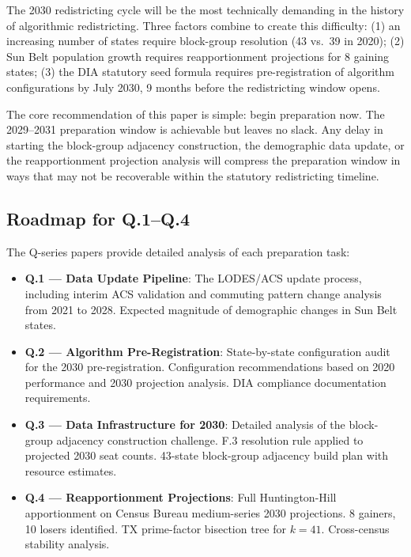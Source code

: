 \label{sec:conclusion}

The 2030 redistricting cycle will be the most technically demanding in the history
of algorithmic redistricting. Three factors combine to create this difficulty:
(1) an increasing number of states require block-group resolution (43 vs.\ 39 in 2020);
(2) Sun Belt population growth requires reapportionment projections for 8 gaining states;
(3) the DIA statutory seed formula requires pre-registration of algorithm configurations
by July 2030, 9 months before the redistricting window opens.

The core recommendation of this paper is simple: begin preparation now.
The 2029--2031 preparation window is achievable but leaves no slack. Any delay
in starting the block-group adjacency construction, the demographic data update,
or the reapportionment projection analysis will compress the preparation window
in ways that may not be recoverable within the statutory redistricting timeline.

\subsection{Roadmap for Q.1--Q.4}

The Q-series papers provide detailed analysis of each preparation task:

\begin{itemize}
\item \textbf{Q.1 --- Data Update Pipeline}: The LODES/ACS update process, including
  interim ACS validation and commuting pattern change analysis from 2021 to 2028.
  Expected magnitude of demographic changes in Sun Belt states.

\item \textbf{Q.2 --- Algorithm Pre-Registration}: State-by-state configuration audit
  for the 2030 pre-registration. Configuration recommendations based on 2020 performance
  and 2030 projection analysis. DIA compliance documentation requirements.

\item \textbf{Q.3 --- Data Infrastructure for 2030}: Detailed analysis of the block-group
  adjacency construction challenge. F.3 resolution rule applied to projected 2030 seat counts.
  43-state block-group adjacency build plan with resource estimates.

\item \textbf{Q.4 --- Reapportionment Projections}: Full Huntington-Hill apportionment
  on Census Bureau medium-series 2030 projections. 8 gainers, 10 losers identified.
  TX prime-factor bisection tree for $k=41$. Cross-census stability analysis.
\end{itemize}

